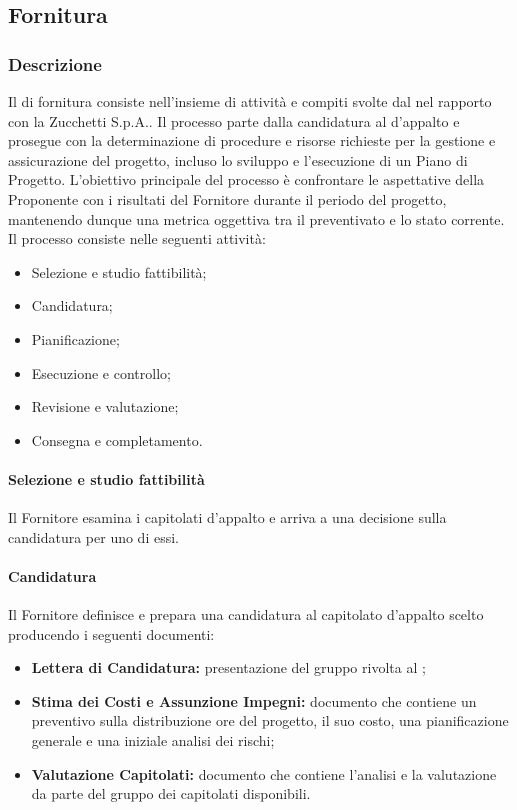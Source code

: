 \subsection{Fornitura}\label{fornitura}

\subsubsection{Descrizione}
Il  di fornitura consiste nell'insieme di attività e compiti svolte dal  nel rapporto con la  Zucchetti S.p.A.. Il processo parte dalla candidatura al  d'appalto e prosegue con la determinazione di procedure e risorse richieste per la gestione e assicurazione del progetto, incluso lo sviluppo e l'esecuzione di un Piano di Progetto.
L'obiettivo principale del processo è confrontare le aspettative della Proponente con i risultati del Fornitore durante il periodo del progetto, mantenendo dunque una metrica oggettiva tra il preventivato e lo stato corrente.\\
Il processo consiste nelle seguenti attività:
\begin{itemize}
  \item Selezione e studio fattibilità;
  \item Candidatura;
  \item Pianificazione;
  \item Esecuzione e controllo;
  \item Revisione e valutazione;
  \item Consegna e completamento.
\end{itemize}

\paragraph{Selezione e studio fattibilità}
Il Fornitore esamina i capitolati d'appalto e arriva a una decisione sulla candidatura per uno di essi.

\paragraph{Candidatura}
Il Fornitore definisce e prepara una candidatura al capitolato d'appalto scelto producendo i seguenti documenti:
\begin{itemize}
  \item \textbf{Lettera di Candidatura:} presentazione del gruppo rivolta al ;
  \item \textbf{Stima dei Costi e Assunzione Impegni:} documento che contiene un preventivo sulla distribuzione ore del progetto, il suo costo, una pianificazione generale e una iniziale analisi dei rischi;
  \item \textbf{Valutazione Capitolati:} documento che contiene l'analisi e la valutazione da parte del gruppo dei capitolati disponibili.
\end{itemize}

